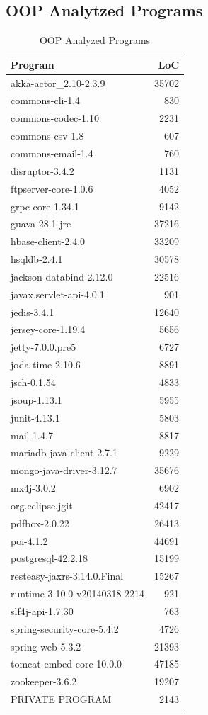 \documentclass[12pt, a4paper]{article}
\begin{document}
\subsection{OOP Analytzed Programs}
\begin{longtable}[H]{l r}
    \caption{OOP Analyzed Programs}\label{table:ax_oop_prog_1}\\
        Program & LoC \\
        \hline            
        \endhead
        akka-actor\_2.10-2.3.9 & 35702 \\
        commons-cli-1.4 & 830 \\
        commons-codec-1.10 & 2231 \\
        commons-csv-1.8 & 607 \\
        commons-email-1.4 & 760 \\
        disruptor-3.4.2 & 1131 \\
        ftpserver-core-1.0.6 & 4052 \\
        grpc-core-1.34.1 & 9142 \\
        guava-28.1-jre & 37216 \\
        hbase-client-2.4.0 & 33209 \\
        hsqldb-2.4.1 & 30578 \\
        jackson-databind-2.12.0 & 22516 \\
        javax.servlet-api-4.0.1 & 901 \\
        jedis-3.4.1 & 12640 \\
        jersey-core-1.19.4 & 5656 \\
        jetty-7.0.0.pre5 & 6727 \\
        joda-time-2.10.6 & 8891 \\
        jsch-0.1.54 & 4833 \\
        jsoup-1.13.1 & 5955 \\
        junit-4.13.1 & 5803 \\
        mail-1.4.7 & 8817 \\
        mariadb-java-client-2.7.1 & 9229 \\
        mongo-java-driver-3.12.7 & 35676 \\
        mx4j-3.0.2 & 6902 \\
        org.eclipse.jgit & 42417 \\
        pdfbox-2.0.22 & 26413 \\
        poi-4.1.2 & 44691 \\
        postgresql-42.2.18 & 15199 \\
        resteasy-jaxrs-3.14.0.Final & 15267 \\
        runtime-3.10.0-v20140318-2214 & 921 \\
        slf4j-api-1.7.30 & 763 \\
        spring-security-core-5.4.2 & 4726 \\
        spring-web-5.3.2 & 21393 \\
        tomcat-embed-core-10.0.0 & 47185 \\
        zookeeper-3.6.2 & 19207 \\
        PRIVATE PROGRAM & 2143
\end{longtable}
\end{document}

